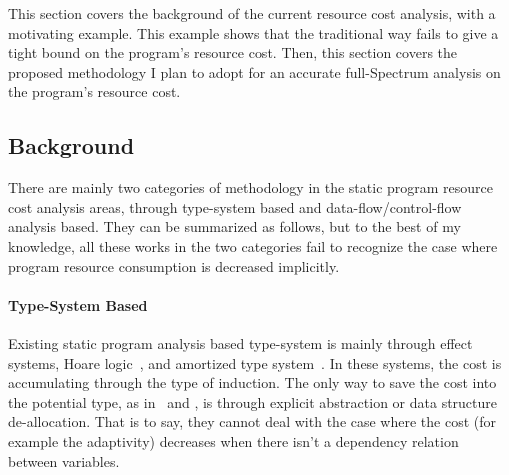 This section covers the background of the current resource cost analysis,
with a 
motivating example.
This example shows that the traditional way fails to give a tight bound on the program's resource cost.
Then, this section covers the proposed methodology I plan to adopt for an accurate full-Spectrum
analysis on 
the program's resource cost.
\subsection{Background}
\label{subsubsec:furthers-cost-backgroung}
There are mainly two categories of methodology in the static program resource cost analysis areas, 
through type-system based and data-flow/control-flow analysis based. 
They can be summarized as follows, but to the best of my knowledge,
all these works in the two categories fail to recognize the case where program resource consumption is decreased implicitly.
 \paragraph*{Type-System Based}
Existing
static program analysis based type-system is mainly through 
effect systems, 
Hoare logic~\cite{gaboardi2021graded}, and amortized type system~\cite{hoffmann_jost_2022}.
%
In these systems, the cost is accumulating through the type of induction. 
The only way to save the cost into the potential
type, as in~\cite{GustafssonEL05} and \cite{hoffmann_jost_2022}, 
is through explicit abstraction or data structure de-allocation.
That is to say, they cannot deal with the case where the cost (for example the adaptivity) decreases when there isn't a dependency relation between variables.
